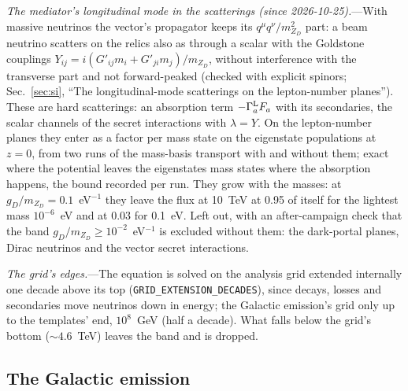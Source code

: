 \documentclass[11pt,a4paper]{article}
\newcommand{\mzd}{m_{Z_D}}
\newcommand{\gd}{g_D}
\begin{document}
\textit{The mediator's longitudinal mode in the scatterings (since 2026-10-25).}---With massive neutrinos the vector's
propagator keeps its $q^\mu q^\nu/\mzd^2$ part: a beam neutrino scatters on the relics also as through a scalar with the
Goldstone couplings $Y_{ij} = i(G'_{ij}m_i + G'_{ji}m_j)/\mzd$, without interference with the transverse part and not
forward-peaked (checked with explicit spinors; Sec.~\ref{sec:si}, ``The longitudinal-mode scatterings on the
lepton-number planes''). These are hard scatterings: an absorption term $-\Gamma^{\rm L}_aF_a$ with its secondaries, the
scalar channels of the secret interactions with $\lambda = Y$. On the lepton-number planes they enter as a factor per
mass state on the eigenstate populations at $z = 0$, from two runs of the mass-basis transport with and without them;
exact where the potential leaves the eigenstates mass states where the absorption happens, the bound recorded per run.
They grow with the masses: at $\gd/\mzd = 0.1$~eV$^{-1}$ they leave the flux at 10~TeV at 0.95 of itself for the
lightest mass $10^{-6}$~eV and at 0.03 for 0.1~eV. Left out, with an after-campaign check that the band
$\gd/\mzd \ge 10^{-2}$~eV$^{-1}$ is excluded without them: the dark-portal planes, Dirac neutrinos and the vector
secret interactions.

\textit{The grid's edges.}---The equation is solved on the analysis grid extended internally one decade above its top
(\texttt{GRID\_EXTENSION\_DECADES}), since decays, losses and secondaries move neutrinos down in energy; the Galactic
emission's grid only up to the templates' end, $10^{8}$~GeV (half a decade). What falls below the grid's bottom
($\sim4.6$~TeV) leaves the band and is dropped.

\subsection{The Galactic emission}
\end{document}
